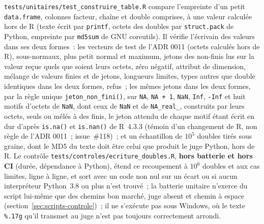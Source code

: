 \documentclass[a4paper,11pt]{article}
\newcommand{\code}[1]{\texttt{\small #1}}
\begin{document}
\code{tests/unitaires/test\_construire\_table.R} compare l'empreinte d'un petit
\code{data.frame}, colonnes facteur, chaîne et double comprises, à une valeur
calculée hors de R (texte écrit par \code{printf}, octets des doubles par
\code{struct.pack} de Python, empreinte par \code{md5sum} de GNU
coreutils). Il vérifie l'écrivain des valeurs dans ses deux formes~: les
vecteurs de test de l'ADR 0011 (octets calculés hors de R), sous-normaux,
plus petit normal et maximum, jetons des non-finis lus sur la valeur reçue
quels que soient leurs octets, zéro négatif, attribut de dimension, mélange
de valeurs finies et de jetons, longueurs limites, types autres que double
identiques dans les deux formes, refus~; les mêmes jetons dans les deux
formes, par la règle unique \code{jeton\_non\_fini()}, sur \code{NA},
\code{NA + 1}, \code{NaN}, \code{Inf}, \code{-Inf} et huit motifs
d'octets de \code{NaN}, dont ceux de \code{NaN} et de \code{NA\_real\_},
construits par leurs octets, seuls ou mêlés à
des finis, le jeton attendu de chaque motif étant écrit en dur d'après
\code{is.na()} et \code{is.nan()} de R~4.3.3 (témoin d'un changement de R,
non règle de l'ADR 0011~; issue~\#118)~; et un échantillon de $10^5$ doubles
tirés sous graine, dont le MD5 du texte doit être celui que produit le juge
Python, hors de R. Le contrôle \code{tests/controles/ecriture\_doubles.R},
\textbf{hors batterie et hors CI} (durée, dépendance à Python), étend ce
recoupement à $10^6$ doubles et aux cas limites, ligne à ligne, et sort avec
un code non nul sur un écart ou si aucun interpréteur Python~3.8 ou plus
n'est trouvé~; la batterie unitaire n'exerce du script lui-même que des
chemins bon marché, juge absent et chemin à espace (section~\ref{sec:scripts-controle})~; il ne s'exécute pas
sous Windows, où le texte \code{\%.17g} qu'il transmet au juge n'est pas
toujours correctement arrondi.
\end{document}

